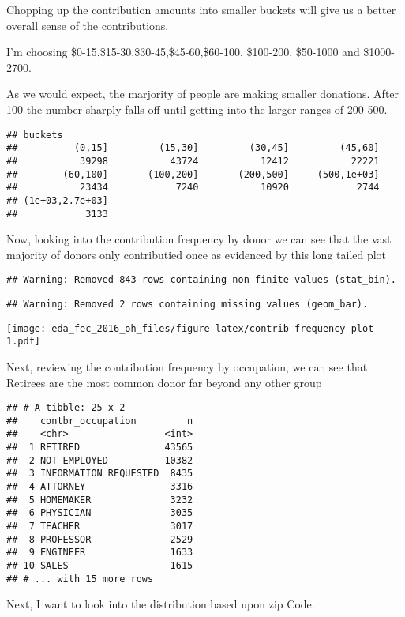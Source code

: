 \documentclass[]{article}
\begin{document}
Chopping up the contribution amounts into smaller buckets will give us a
better overall sense of the contributions.

I'm choosing \$0-15,\$15-30,\$30-45,\$45-60,\$60-100, \$100-200,
\$50-1000 and \$1000-2700.

As we would expect, the marjority of people are making smaller
donations. After 100 the number sharply falls off until getting into the
larger ranges of 200-500.

\begin{verbatim}
## buckets
##          (0,15]         (15,30]         (30,45]         (45,60] 
##           39298           43724           12412           22221 
##        (60,100]       (100,200]       (200,500]     (500,1e+03] 
##           23434            7240           10920            2744 
## (1e+03,2.7e+03] 
##            3133
\end{verbatim}

Now, looking into the contribution frequency by donor we can see that
the vast majority of donors only contributied once as evidenced by this
long tailed plot

\begin{verbatim}
## Warning: Removed 843 rows containing non-finite values (stat_bin).
\end{verbatim}

\begin{verbatim}
## Warning: Removed 2 rows containing missing values (geom_bar).
\end{verbatim}

\texttt{[image: eda\_fec\_2016\_oh\_files/figure-latex/contrib frequency plot-1.pdf]}

Next, reviewing the contribution frequency by occupation, we can see
that Retirees are the most common donor far beyond any other group

\begin{verbatim}
## # A tibble: 25 x 2
##    contbr_occupation         n
##    <chr>                 <int>
##  1 RETIRED               43565
##  2 NOT EMPLOYED          10382
##  3 INFORMATION REQUESTED  8435
##  4 ATTORNEY               3316
##  5 HOMEMAKER              3232
##  6 PHYSICIAN              3035
##  7 TEACHER                3017
##  8 PROFESSOR              2529
##  9 ENGINEER               1633
## 10 SALES                  1615
## # ... with 15 more rows
\end{verbatim}

Next, I want to look into the distribution based upon zip Code.
\end{document}

